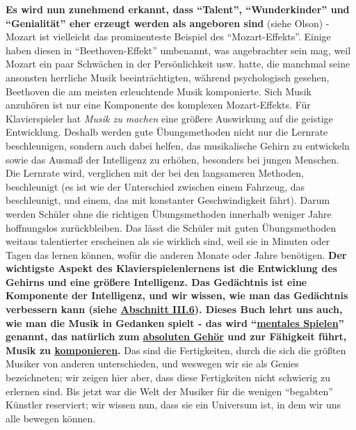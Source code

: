 \textbf{Es wird nun zunehmend erkannt, dass \enquote{Talent}, \enquote{Wunderkinder} und \enquote{Genialität} eher erzeugt werden als angeboren sind} (siehe Olson) - Mozart ist vielleicht das prominenteste Beispiel des \enquote{Mozart-Effekts}.
 Einige haben diesen in \enquote{Beethoven-Effekt} umbenannt, was angebrachter sein mag, weil Mozart ein paar Schwächen in der Persönlichkeit usw. hatte, die manchmal seine ansonsten herrliche Musik beeinträchtigten, während psychologisch gesehen, Beethoven die am meisten erleuchtende Musik komponierte.
 Sich Musik anzuhören ist nur eine Komponente des komplexen Mozart-Effekts.
 Für Klavierspieler hat \textit{Musik zu machen} eine größere Auswirkung auf die geistige Entwicklung.
 Deshalb werden gute Übungsmethoden nicht nur die Lernrate beschleunigen, sondern auch dabei helfen, das musikalische Gehirn zu entwickeln sowie das Ausmaß der Intelligenz zu erhöhen, besonders bei jungen Menschen.
 Die Lernrate wird, verglichen mit der bei den langsameren Methoden, beschleunigt (es ist wie der Unterschied zwischen einem Fahrzeug, das beschleunigt, und einem, das mit konstanter Geschwindigkeit fährt).
 Darum werden Schüler ohne die richtigen Übungsmethoden innerhalb weniger Jahre hoffnungslos zurückbleiben.
 Das lässt die Schüler mit guten Übungsmethoden weitaus talentierter erscheinen als sie wirklich sind, weil sie in Minuten oder Tagen das lernen können, wofür die anderen Monate oder Jahre benötigen.
 \textbf{Der wichtigste Aspekt des Klavierspielenlernens ist die Entwicklung des Gehirns und eine größere Intelligenz.
 Das Gedächtnis ist eine Komponente der Intelligenz, und wir wissen, wie man das Gedächtnis verbessern kann (siehe \hyperlink{c1iii6}{Abschnitt III.6}).
 Dieses Buch lehrt uns auch, wie man die Musik in Gedanken spielt - das wird \enquote{\hyperlink{c1ii12mental}{mentales Spielen}} genannt, das natürlich zum \hyperlink{c1iii12}{absoluten Gehör} und zur Fähigkeit führt, Musik zu \hyperlink{c1iii12blatt}{komponieren}.}
 Das sind die Fertigkeiten, durch die sich die größten Musiker von anderen unterschieden, und weswegen wir sie als Genies bezeichneten; wir zeigen hier aber, dass diese Fertigkeiten nicht schwierig zu erlernen sind.
 Bis jetzt war die Welt der Musiker für die wenigen \enquote{begabten} Künstler reserviert; wir wissen nun, dass sie ein Universum ist, in dem wir uns alle bewegen können.
 

